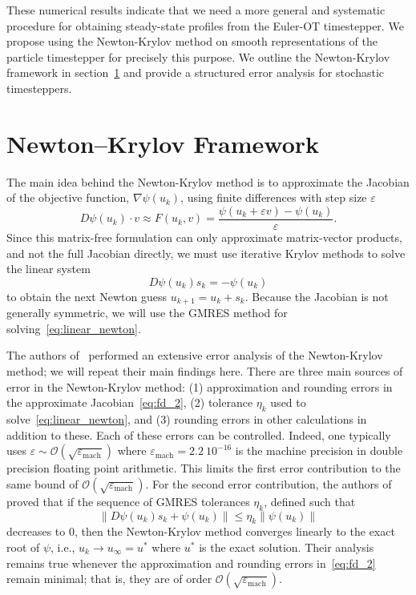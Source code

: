 \documentclass{article}
\newcommand{\norm}[1]{\left\lVert#1\right\rVert}
\begin{document}
These numerical results indicate that we need a more general and systematic procedure for obtaining steady-state profiles from the Euler-OT timestepper. We propose using the Newton-Krylov method on smooth representations of the particle timestepper for precisely this purpose. We outline the Newton-Krylov framework in section~\ref{sec:nk} and provide a structured error analysis for stochastic timesteppers.

\section{Newton--Krylov Framework} \label{sec:nk}
The main idea behind the Newton-Krylov method is to approximate the Jacobian of the objective function, $\nabla \psi(u_k)$, using finite differences with step size $\varepsilon$
\begin{equation} \label{eq:fd_2}
    D \psi(u_k) \cdot v \approx F(u_k, v) = \frac{\psi(u_k + \varepsilon v) - \psi(u_k)}{\varepsilon}.
\end{equation}
Since this matrix-free formulation can only approximate matrix-vector products, and not the full Jacobian directly, we must use iterative Krylov methods to solve the linear system
\begin{equation} \label{eq:linear_newton}
    D\psi(u_k) s_k = -\psi(u_k)
\end{equation}
to obtain the next Newton guess $u_{k+1} = u_k + s_k$. Because the Jacobian is not generally symmetric, we will use the GMRES method for solving~\eqref{eq:linear_newton}.

The authors of~\cite{} performed an extensive error analysis of the Newton-Krylov method; we will repeat their main findings here. There are three main sources of error in the Newton-Krylov method: (1) approximation and rounding errors in the approximate Jacobian~\eqref{eq:fd_2}, (2) tolerance $\eta_k$ used to solve~\eqref{eq:linear_newton}, and (3) rounding errors in other calculations in addition to these. Each of these errors can be controlled. Indeed, one typically uses $\varepsilon \sim \mathcal{O}\left(\sqrt{\varepsilon_{\text{mach}}}\right)$ where $\varepsilon_{\text{mach}} = 2.2 \ 10^{-16}$ is the machine precision in double precision floating point arithmetic. This limits the first error contribution to the same bound of $\mathcal{O}\left(\sqrt{\varepsilon_{\text{mach}}}\right)$. For the second error contribution, the authors of~\cite[Theorem 2.12]{} proved that if the sequence of GMRES tolerances $\eta_k$, defined such that
\begin{equation}
    \norm{D\psi(u_k) s_k + \psi(u_k)} \leq \eta_k \norm{\psi(u_k)}
\end{equation}
decreases to $0$, then the Newton-Krylov method converges linearly to the exact root of $\psi$, i.e., $u_k \to u_{\infty} = u^*$ where $u^*$ is the exact solution. Their analysis remains true whenever the approximation and rounding errors in~\eqref{eq:fd_2} remain minimal; that is, they are of order $\mathcal{O}\left(\sqrt{\varepsilon_{\text{mach}}}\right)$.
\end{document}
